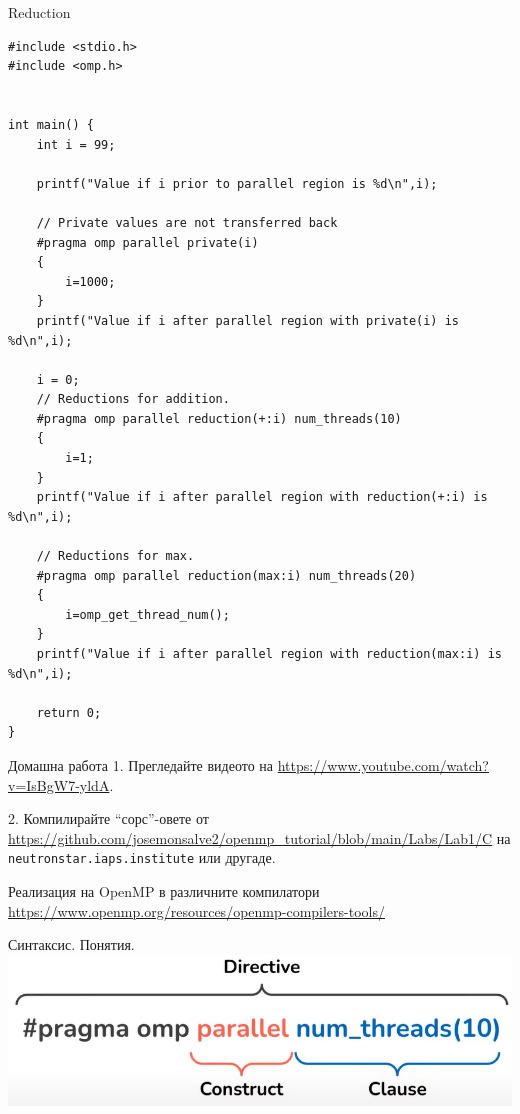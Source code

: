 \documentclass{beamer}
\begin{document}
\begin{frame}[fragile]{Reduction}
\lstset{language=C++}
\begin{lstlisting}
#include <stdio.h>
#include <omp.h>


int main() {
    int i = 99;

    printf("Value if i prior to parallel region is %d\n",i);

    // Private values are not transferred back
    #pragma omp parallel private(i)
    {
        i=1000;
    }
    printf("Value if i after parallel region with private(i) is %d\n",i);

    i = 0;
    // Reductions for addition.
    #pragma omp parallel reduction(+:i) num_threads(10)
    {
        i=1;
    }
    printf("Value if i after parallel region with reduction(+:i) is %d\n",i);

    // Reductions for max.
    #pragma omp parallel reduction(max:i) num_threads(20)
    {
        i=omp_get_thread_num();
    }
    printf("Value if i after parallel region with reduction(max:i) is %d\n",i);

    return 0;
}
  \end{lstlisting}
\end{frame}

\begin{frame}[fragile]{Домашна работа}
  1. Прегледайте видеото на \url{https://www.youtube.com/watch?v=IsBgW7-yldA}.

  2. Компилирайте ``сорс''-овете от
  \url{https://github.com/josemonsalve2/openmp_tutorial/blob/main/Labs/Lab1/C}
  на \verb+neutronstar.iaps.institute+ или другаде.
\end{frame}


\begin{frame}{Реализация на OpenMP в различните компилатори}
  \url{https://www.openmp.org/resources/openmp-compilers-tools/}
\end{frame}


\begin{frame}{Синтаксис. Понятия.}
  \includegraphics[width=\textwidth]{terms-pragma}
\end{frame}
\end{document}
